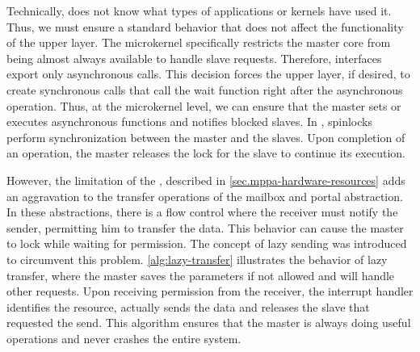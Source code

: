 			Technically, \nanvix \hal does not know what types of applications or kernels have used it. Thus, we must ensure a standard behavior that does not affect the functionality of the upper layer. The microkernel specifically restricts the master core from being almost always available to handle slave requests. Therefore, interfaces export only asynchronous calls. This decision forces the upper layer, if desired, to create synchronous calls that call the wait function right after the asynchronous operation. Thus, at the microkernel level, we can ensure that the master sets or executes asynchronous functions and notifies blocked slaves. In \mppa, spinlocks perform synchronization between the master and the slaves. Upon completion of an operation, the master releases the lock for the slave to continue its execution.

			However, the limitation of the \dma, described in \autoref{sec.mppa-hardware-resources} adds an aggravation to the transfer operations of the mailbox and portal abstraction. In these abstractions, there is a flow control where the receiver must notify the sender, permitting him to transfer the data. This behavior can cause the master to lock while waiting for permission. The concept of lazy sending was introduced to circumvent this problem. \autoref{alg:lazy-transfer} illustrates the behavior of lazy transfer, where the master saves the parameters if not allowed and will handle other requests. Upon receiving permission from the receiver, the interrupt handler identifies the resource, actually sends the data and releases the slave that requested the send. This algorithm ensures that the master is always doing useful operations and never crashes the entire system.

